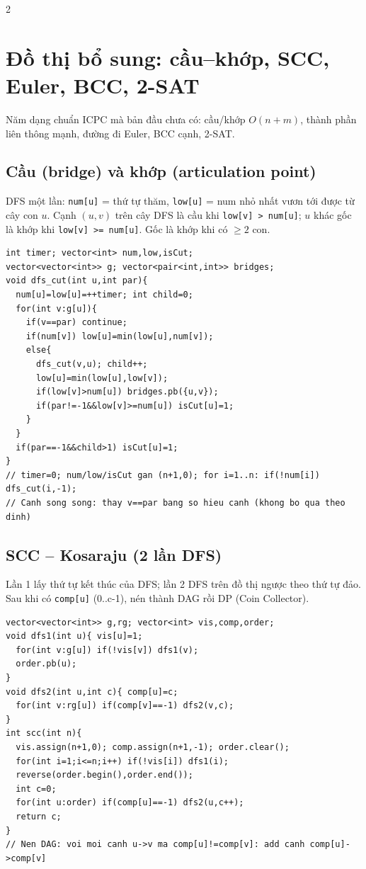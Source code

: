 \documentclass[8pt]{extarticle}
\begin{document}
\begin{multicols}{2}
\section{Đồ thị bổ sung: cầu--khớp, SCC, Euler, BCC, 2-SAT}
Năm dạng chuẩn ICPC mà bản đầu chưa có: cầu/khớp $O(n+m)$, thành phần liên thông mạnh, đường đi Euler, BCC cạnh, 2-SAT.

\subsection{Cầu (bridge) và khớp (articulation point)}
DFS một lần: \texttt{num[u]} = thứ tự thăm, \texttt{low[u]} = num nhỏ nhất vươn tới được từ cây con $u$. Cạnh $(u,v)$ trên cây DFS là cầu khi \texttt{low[v] > num[u]}; $u$ khác gốc là khớp khi \texttt{low[v] >= num[u]}. Gốc là khớp khi có $\ge 2$ con.
\begin{lstlisting}
int timer; vector<int> num,low,isCut;
vector<vector<int>> g; vector<pair<int,int>> bridges;
void dfs_cut(int u,int par){
  num[u]=low[u]=++timer; int child=0;
  for(int v:g[u]){
    if(v==par) continue;
    if(num[v]) low[u]=min(low[u],num[v]);
    else{
      dfs_cut(v,u); child++;
      low[u]=min(low[u],low[v]);
      if(low[v]>num[u]) bridges.pb({u,v});
      if(par!=-1&&low[v]>=num[u]) isCut[u]=1;
    }
  }
  if(par==-1&&child>1) isCut[u]=1;
}
// timer=0; num/low/isCut gan (n+1,0); for i=1..n: if(!num[i]) dfs_cut(i,-1);
// Canh song song: thay v==par bang so hieu canh (khong bo qua theo dinh)
\end{lstlisting}

\subsection{SCC -- Kosaraju (2 lần DFS)}
Lần 1 lấy thứ tự kết thúc của DFS; lần 2 DFS trên đồ thị ngược theo thứ tự đảo. Sau khi có \texttt{comp[u]} (0..c-1), nén thành DAG rồi DP (Coin Collector).
\begin{lstlisting}
vector<vector<int>> g,rg; vector<int> vis,comp,order;
void dfs1(int u){ vis[u]=1;
  for(int v:g[u]) if(!vis[v]) dfs1(v);
  order.pb(u);
}
void dfs2(int u,int c){ comp[u]=c;
  for(int v:rg[u]) if(comp[v]==-1) dfs2(v,c);
}
int scc(int n){
  vis.assign(n+1,0); comp.assign(n+1,-1); order.clear();
  for(int i=1;i<=n;i++) if(!vis[i]) dfs1(i);
  reverse(order.begin(),order.end());
  int c=0;
  for(int u:order) if(comp[u]==-1) dfs2(u,c++);
  return c;
}
// Nen DAG: voi moi canh u->v ma comp[u]!=comp[v]: add canh comp[u]->comp[v]
\end{lstlisting}


\end{multicols}
\end{document}
